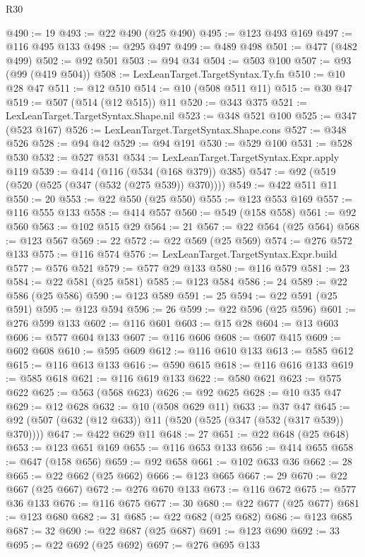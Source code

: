 \begin{lexlean}{R30}
\begin{coremodule}
@490 := 19
@493 := @22 @490 (@25 @490)
@495 := @123 @493 @169
@497 := @116 @495 @133
@498 := @295 @497
@499 := @489 @498
@501 := @477 (@482 @499)
@502 := @92 @501
@503 := @94 @34
@504 := @503 @100
@507 := @93 (@99 (@419 @504))
@508 := LexLeanTarget.TargetSyntax.Ty.fn
@510 := @10 @28 @47
@511 := @12 @510
@514 := @10 (@508 @511 @11)
@515 := @30 @47
@519 := @507 (@514 (@12 @515)) @11
@520 := @343 @375
@521 := LexLeanTarget.TargetSyntax.Shape.nil
@523 := @348 @521 @100
@525 := @347 (@523 @167)
@526 := LexLeanTarget.TargetSyntax.Shape.cons
@527 := @348 @526
@528 := @94 @42
@529 := @94 @191
@530 := @529 @100
@531 := @528 @530
@532 := @527 @531
@534 := LexLeanTarget.TargetSyntax.Expr.apply @119
@539 := @414 (@116 (@534 (@168 @379)) @385)
@547 := @92 (@519 (@520 (@525 (@347 (@532 (@275 @539)) @370))))
@549 := @422 @511 @11
@550 := 20
@553 := @22 @550 (@25 @550)
@555 := @123 @553 @169
@557 := @116 @555 @133
@558 := @414 @557
@560 := @549 (@158 @558)
@561 := @92 @560
@563 := @102 @515 @29
@564 := 21
@567 := @22 @564 (@25 @564)
@568 := @123 @567
@569 := 22
@572 := @22 @569 (@25 @569)
@574 := @276 @572 @133
@575 := @116 @574
@576 := LexLeanTarget.TargetSyntax.Expr.build
@577 := @576 @521
@579 := @577 @29 @133
@580 := @116 @579
@581 := 23
@584 := @22 @581 (@25 @581)
@585 := @123 @584
@586 := 24
@589 := @22 @586 (@25 @586)
@590 := @123 @589
@591 := 25
@594 := @22 @591 (@25 @591)
@595 := @123 @594
@596 := 26
@599 := @22 @596 (@25 @596)
@601 := @276 @599 @133
@602 := @116 @601
@603 := @15 @28
@604 := @13 @603
@606 := @577 @604 @133
@607 := @116 @606
@608 := @607 @415
@609 := @602 @608
@610 := @595 @609
@612 := @116 @610 @133
@613 := @585 @612
@615 := @116 @613 @133
@616 := @590 @615
@618 := @116 @616 @133
@619 := @585 @618
@621 := @116 @619 @133
@622 := @580 @621
@623 := @575 @622
@625 := @563 (@568 @623)
@626 := @92 @625
@628 := @10 @35 @47
@629 := @12 @628
@632 := @10 (@508 @629 @11)
@633 := @37 @47
@645 := @92 (@507 (@632 (@12 @633)) @11 (@520 (@525 (@347 (@532 (@317 @539)) @370))))
@647 := @422 @629 @11
@648 := 27
@651 := @22 @648 (@25 @648)
@653 := @123 @651 @169
@655 := @116 @653 @133
@656 := @414 @655
@658 := @647 (@158 @656)
@659 := @92 @658
@661 := @102 @633 @36
@662 := 28
@665 := @22 @662 (@25 @662)
@666 := @123 @665
@667 := 29
@670 := @22 @667 (@25 @667)
@672 := @276 @670 @133
@673 := @116 @672
@675 := @577 @36 @133
@676 := @116 @675
@677 := 30
@680 := @22 @677 (@25 @677)
@681 := @123 @680
@682 := 31
@685 := @22 @682 (@25 @682)
@686 := @123 @685
@687 := 32
@690 := @22 @687 (@25 @687)
@691 := @123 @690
@692 := 33
@695 := @22 @692 (@25 @692)
@697 := @276 @695 @133

\end{coremodule}
\end{lexlean}
